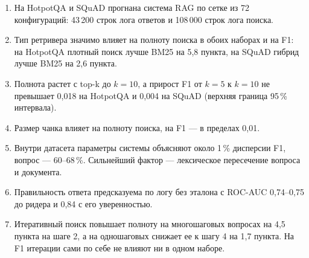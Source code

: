 \begin{enumerate}
\item На HotpotQA и SQuAD прогнана система RAG по сетке из 72 конфигураций: 43\,200 строк лога ответов и 108\,000 строк лога поиска.
\item Тип ретривера значимо влияет на полноту поиска в обоих наборах и на F1: на HotpotQA плотный поиск лучше BM25 на 5,8 пункта, на SQuAD гибрид лучше BM25 на 2,6 пункта.
\item Полнота растет с top-k до $k = 10$, а прирост F1 от $k = 5$ к $k = 10$ не превышает 0,018 на HotpotQA и 0,004 на SQuAD (верхняя граница 95\,\% интервала).
\item Размер чанка влияет на полноту поиска, на F1 --- в пределах 0,01.
\item Внутри датасета параметры системы объясняют около 1\,\% дисперсии F1, вопрос --- 60--68\,\%. Сильнейший фактор --- лексическое пересечение вопроса и документа.
\item Правильность ответа предсказуема по логу без эталона с ROC-AUC 0,74--0,75 до ридера и 0,84 с его уверенностью.
\item Итеративный поиск повышает полноту на многошаговых вопросах на 4,5 пункта на шаге 2, а на одношаговых снижает ее к шагу 4 на 1,7 пункта. На F1 итерации сами по себе не влияют ни в одном наборе.
\end{enumerate}
